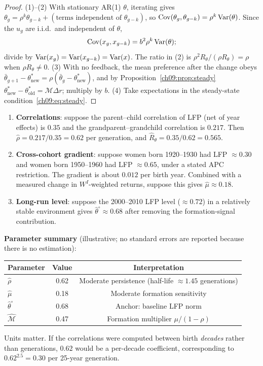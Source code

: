 \documentclass[../structural_economics_book.tex]{subfiles}
\begin{document}
\begin{proof}
(1)--(2) With stationary AR(1) $\theta$, iterating gives $\theta_g = \rho^k\theta_{g-k} + (\text{terms independent of } \theta_{g-k})$, so $\operatorname{Cov}(\theta_g, \theta_{g-k}) = \rho^k\operatorname{Var}(\theta)$. Since the $u_g$ are i.i.d.\ and independent of $\theta$,
\[
\operatorname{Cov}(x_g, x_{g-k}) = b^2\rho^k\operatorname{Var}(\theta);
\]
divide by $\operatorname{Var}(x_g) = \operatorname{Var}(x_{g-k}) = \operatorname{Var}(x)$. The ratio in (2) is $\rho^2R_\theta/(\rho R_\theta) = \rho$ when $\rho R_\theta \neq 0$. (3) With no feedback, the mean preference after the change obeys $\bar{\theta}_{g+1} - \theta^*_{\text{new}} = \rho(\bar{\theta}_g - \theta^*_{\text{new}})$, and by Proposition~\ref{ch09:prop:steady} $\theta^*_{\text{new}} - \theta^*_{\text{old}} = \mathcal{M}\Delta r$; multiply by $b$. (4) Take expectations in the steady-state condition~\eqref{ch09:eq:steady}.
\end{proof}

\begin{example}\label{ch11:ex:rho_mu}
\leavevmode
\begin{enumerate}
\item \textbf{Correlations}: suppose the parent--child correlation of LFP (net of year effects) is $0.35$ and the grandparent--grandchild correlation is $0.217$. Then $\hat{\rho} = 0.217/0.35 = 0.62$ per generation, and $\hat{R}_\theta = 0.35/0.62 = 0.565$.
\item \textbf{Cross-cohort gradient}: suppose women born 1920--1930 had LFP $\approx 0.30$ and women born 1950--1960 had LFP $\approx 0.65$, under a stated APC restriction. The gradient is about $0.012$ per birth year. Combined with a measured change in $W^I$-weighted returns, suppose this gives $\hat{\mu} \approx 0.18$.
\item \textbf{Long-run level}: suppose the 2000--2010 LFP level ($\approx 0.72$) in a relatively stable environment gives $\hat{\theta}^{\circ} \approx 0.68$ after removing the formation-signal contribution.
\end{enumerate}

\textbf{Parameter summary} (illustrative; no standard errors are reported because there is no estimation):
\begin{center}
\begin{tabular}{lcc}
\toprule
Parameter & Value & Interpretation \\
\midrule
$\hat{\rho}$ & 0.62 & Moderate persistence (half-life $\approx 1.45$ generations) \\
$\hat{\mu}$ & 0.18 & Moderate formation sensitivity \\
$\hat{\theta}^{\circ}$ & 0.68 & Anchor: baseline LFP norm \\
$\hat{\mathcal{M}}$ & 0.47 & Formation multiplier $\mu/(1-\rho)$ \\
\bottomrule
\end{tabular}
\end{center}
Units matter. If the correlations were computed between birth \textit{decades} rather than generations, $0.62$ would be a per-decade coefficient, corresponding to $0.62^{2.5} = 0.30$ per 25-year generation.
\end{example}
\end{document}
